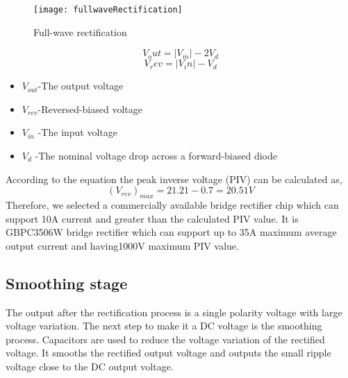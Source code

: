 \documentclass[11pt,a4paper]{article}
\begin{document}
\begin{multicols}{2}
\begin{figure}[H]
 \centering
    \texttt{[image: fullwaveRectification]}
    \caption{Full-wave rectification}
    \label{fig:Rectification}
\end{figure}

\begin{equation}
    V_out=|V_{in}|-2V_d
\end{equation}
\begin{equation}
    V_rev=|V_in|-V_d
\end{equation}
\begin{itemize}
  \item $V_{out}$-The output voltage
  \vspace{-0.1in}
  \item $V_{rev}$-Reversed-biased voltage
  \vspace{-0.1in}
  \item $V_{in}$  -The input voltage
 \vspace{-0.1in}
  \item $V_d$   -The nominal voltage drop across a forward-biased diode \vspace{-0.1in}
\end{itemize}

According to the equation the peak inverse voltage (PIV) can be calculated as,
\begin{equation}
    (V_{rev})_{max} =21.21 - 0.7 = 20.51V
\end{equation}
Therefore, we selected a commercially available bridge rectifier chip which can support 10A current and greater than the calculated PIV value. It is GBPC3506W bridge rectifier which can support up to 35A maximum average output current and having1000V maximum PIV value.

\subsection{Smoothing stage}
The output after the rectification process is a single polarity voltage with large voltage variation. The next step to make it a DC voltage is the smoothing process. Capacitors are used to reduce the voltage variation of the rectified voltage. It smooths the rectified output voltage and outputs the small ripple voltage close to the DC output voltage. 


\end{multicols}
\end{document}
